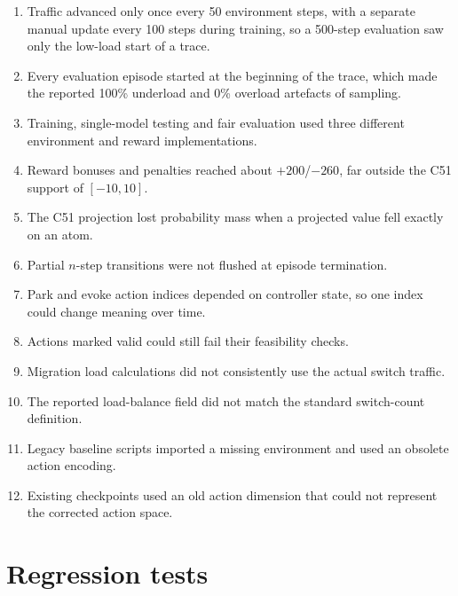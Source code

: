 \begin{enumerate}[leftmargin=*]
  \item Traffic advanced only once every 50 environment steps, with a separate manual update every 100 steps during training, so a 500-step evaluation saw only the low-load start of a trace.
  \item Every evaluation episode started at the beginning of the trace, which made the reported 100\% underload and 0\% overload artefacts of sampling.
  \item Training, single-model testing and fair evaluation used three different environment and reward implementations.
  \item Reward bonuses and penalties reached about $+200$/$-260$, far outside the C51 support of $[-10,10]$.
  \item The C51 projection lost probability mass when a projected value fell exactly on an atom.
  \item Partial $n$-step transitions were not flushed at episode termination.
  \item Park and evoke action indices depended on controller state, so one index could change meaning over time.
  \item Actions marked valid could still fail their feasibility checks.
  \item Migration load calculations did not consistently use the actual switch traffic.
  \item The reported load-balance field did not match the standard switch-count definition.
  \item Legacy baseline scripts imported a missing environment and used an obsolete action encoding.
  \item Existing checkpoints used an old action dimension that could not represent the corrected action space.
\end{enumerate}

\section{Regression tests}

